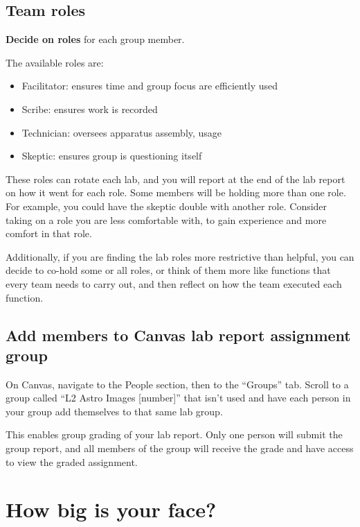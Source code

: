 \subsection{Team roles}

\begin{steps}
	\item \textbf{Decide on roles} for each group member.
\end{steps}

The available roles are:
\begin{itemize}
	\item Facilitator: ensures time and group focus are efficiently used
	\item Scribe: ensures work is recorded
	\item Technician: oversees apparatus assembly, usage
	\item Skeptic: ensures group is questioning itself
\end{itemize}

These roles can rotate each lab, and you will report at the end of the lab report on how it went for each role. Some members will be holding more than one role. For example, you could have the skeptic double with another role. Consider taking on a role you are less comfortable with, to gain experience and more comfort in that role.

Additionally, if you are finding the lab roles more restrictive than helpful, you can decide to co-hold some or all roles, or think of them more like functions that every team needs to carry out, and then reflect on how the team executed each function.

\subsection{Add members to Canvas lab report assignment group}

\begin{steps}
	\item On Canvas, navigate to the People section, then to the ``Groups'' tab. Scroll to a group called ``L2 Astro Images [number]'' that isn't used and have each person in your group add themselves to that same lab group.
\end{steps}

This enables group grading of your lab report. Only one person will submit the group report, and all members of the group will receive the grade and have access to view the graded assignment.

\section{How big is your face?}

